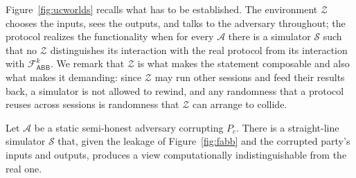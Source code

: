 \documentclass[11pt]{article}
\newcommand{\Fabb}{\mathcal{F}_{\mathsf{ABB}}}
\begin{document}
Figure~\ref{fig:ucworlds} recalls what has to be established. The environment $\mathcal{Z}$
chooses the inputs, sees the outputs, and talks to the adversary throughout; the protocol
realizes the functionality when for every $\mathcal{A}$ there is a simulator $\mathcal{S}$ such
that no $\mathcal{Z}$ distinguishes its interaction with the real protocol from its interaction
with $\Fabb^k$. We remark that $\mathcal{Z}$ is what makes the statement composable and also
what makes it demanding: since $\mathcal{Z}$ may run other sessions and feed their results back,
a simulator is not allowed to rewind, and any randomness that a protocol reuses across sessions
is randomness that $\mathcal{Z}$ can arrange to collide.

\begin{theorem}[Simulator]
\label{thm:sim}
Let $\mathcal{A}$ be a static semi-honest adversary corrupting $P_c$. There is a straight-line
simulator $\mathcal{S}$ that, given the leakage of Figure~\ref{fig:fabb} and the corrupted
party's inputs and outputs, produces a view computationally indistinguishable from the real
one.
\end{theorem}
\end{document}
